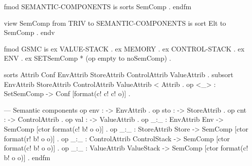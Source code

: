 \documentclass{llncs}%
\begin{document}
\begin{maude}[caption=Generalized SMC in Maude,label=lst:gsmc-maude]
fmod SEMANTIC-COMPONENTS is
    sorts SemComp . 
endfm

view SemComp from TRIV to SEMANTIC-COMPONENTS is
    sort Elt to SemComp . 
endv

fmod GSMC is
    ex VALUE-STACK .
    ex MEMORY .
    ex CONTROL-STACK .
    ex ENV . 
    ex SET{SemComp} * (op empty to noSemComp) .

    sorts Attrib Conf EnvAttrib StoreAttrib ControlAttrib ValueAttrib .
    subsort EnvAttrib StoreAttrib ControlAttrib ValueAttrib < Attrib  .
    op <_> : Set{SemComp} -> Conf [format(c! c! c! o)] . 

    --- Semantic components
    op env : -> EnvAttrib .
    op sto : -> StoreAttrib .
    op cnt : -> ControlAttrib .
    op val : -> ValueAttrib .
    op _:_ : EnvAttrib Env -> SemComp [ctor format(c! b! o o)] .
    op _:_ : StoreAttrib Store -> SemComp [ctor format(r! b! o o)] .
    op _:_ : ControlAttrib ControlStack -> SemComp [ctor format(c! b! o o)] .
    op _:_ : ValueAttrib ValueStack -> SemComp [ctor format(c! b! o o)] .
endfm
\end{maude}

%
%
%
\end{document}

